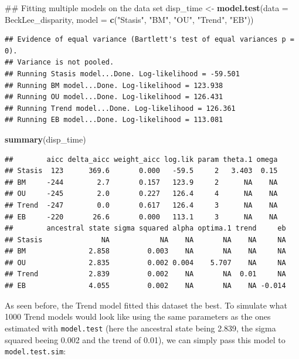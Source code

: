 \documentclass[]{book}
\newenvironment{Shaded}{\begin{snugshade}}{\end{snugshade}}
\newcommand{\KeywordTok}[1]{\textcolor[rgb]{0.13,0.29,0.53}{\textbf{#1}}}
\newcommand{\DataTypeTok}[1]{\textcolor[rgb]{0.13,0.29,0.53}{#1}}
\newcommand{\StringTok}[1]{\textcolor[rgb]{0.31,0.60,0.02}{#1}}
\newcommand{\NormalTok}[1]{#1}
\theoremstyle{definition}
\theoremstyle{definition}
\theoremstyle{definition}
\theoremstyle{remark}
\begin{document}
\begin{Shaded}
\begin{Highlighting}[]
\NormalTok{## Fitting multiple models on the data set}
\NormalTok{disp_time <-}\StringTok{ }\KeywordTok{model.test}\NormalTok{(}\DataTypeTok{data =}\NormalTok{ BeckLee_disparity, }\DataTypeTok{model =} \KeywordTok{c}\NormalTok{(}\StringTok{"Stasis"}\NormalTok{, }\StringTok{"BM"}\NormalTok{, }\StringTok{"OU"}\NormalTok{, }\StringTok{"Trend"}\NormalTok{, }\StringTok{"EB"}\NormalTok{))}
\end{Highlighting}
\end{Shaded}

\begin{verbatim}
## Evidence of equal variance (Bartlett's test of equal variances p = 0).
## Variance is not pooled.
## Running Stasis model...Done. Log-likelihood = -59.501
## Running BM model...Done. Log-likelihood = 123.938
## Running OU model...Done. Log-likelihood = 126.431
## Running Trend model...Done. Log-likelihood = 126.361
## Running EB model...Done. Log-likelihood = 113.081
\end{verbatim}

\begin{Shaded}
\begin{Highlighting}[]
\KeywordTok{summary}\NormalTok{(disp_time)}
\end{Highlighting}
\end{Shaded}

\begin{verbatim}
##        aicc delta_aicc weight_aicc log.lik param theta.1 omega
## Stasis  123      369.6       0.000   -59.5     2   3.403  0.15
## BM     -244        2.7       0.157   123.9     2      NA    NA
## OU     -245        2.0       0.227   126.4     4      NA    NA
## Trend  -247        0.0       0.617   126.4     3      NA    NA
## EB     -220       26.6       0.000   113.1     3      NA    NA
##        ancestral state sigma squared alpha optima.1 trend     eb
## Stasis              NA            NA    NA       NA    NA     NA
## BM               2.858         0.003    NA       NA    NA     NA
## OU               2.835         0.002 0.004    5.707    NA     NA
## Trend            2.839         0.002    NA       NA  0.01     NA
## EB               4.055         0.002    NA       NA    NA -0.014
\end{verbatim}

As seen before, the Trend model fitted this dataset the best. To
simulate what 1000 Trend models would look like using the same
parameters as the ones estimated with \texttt{model.test} (here the
ancestral state being 2.839, the sigma squared beeing 0.002 and the
trend of 0.01), we can simply pass this model to
\texttt{model.test.sim}:
\end{document}
